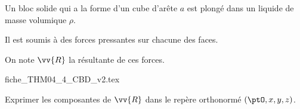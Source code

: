                                 \initialisationPartieGauche %
Un bloc solide qui a la forme d'un cube d'arête $a$ est plongé dans un liquide de masse volumique $\rho$. 

Il est soumis à des forces pressantes sur chacune des faces. 

On note $\vv{R}$ la résultante de ces forces. 

\smallskip

                                \initialisationPartieDroite %
\def\ratioScaleImage{1}
\begin{center}
{fiche_THM04_4_CBD_v2.tex}
\end{center}
                               \finalisationDuPartageDePage %


Exprimer les composantes de $\vv{R}$ dans le repère orthonormé $(\ptO,x,y,z)$.
\smallskip


\debutEntrainement

